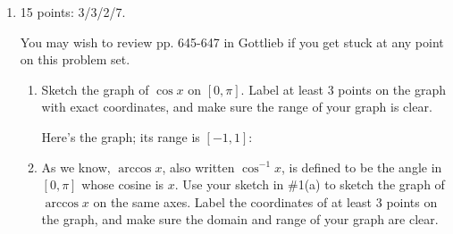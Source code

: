 \documentclass{article}
\begin{document}
\begin{enumerate}[topsep=0pt]
\item 

\begin{grading}
 15 points:   3/3/2/7.
\end{grading}

You may wish to review pp. 645-647 in Gottlieb if you get stuck at any point on this problem set.

  \begin{enumerate}[topsep=0pt]
  \item
\begin{problem}[\stretch{3}]
      Sketch the graph of $\cos x$ on $[0, \pi]$.  Label at least 3 points
      on the graph with exact coordinates, and make sure the range of your
      graph is clear.
    \end{problem}

    \begin{solution} 
      Here's the graph; its range is $[-1, 1]$:
      \begin{center}
      \end{center}      
    \end{solution}

  \item
    \begin{problem}
      As we know, $\arccos x$, also written $\cos^{-1} x$, is defined to
      be the angle in $[0, \pi]$ whose cosine is $x$.  Use your sketch in
      {{{{\#1}}(a)}} to sketch the graph of $\arccos x$ on the same axes.  Label the coordinates of at least 3
      points on the graph, and make sure the domain and range of your
      graph are clear.
    \end{problem}


\end{enumerate}
\end{enumerate}
\end{document}
